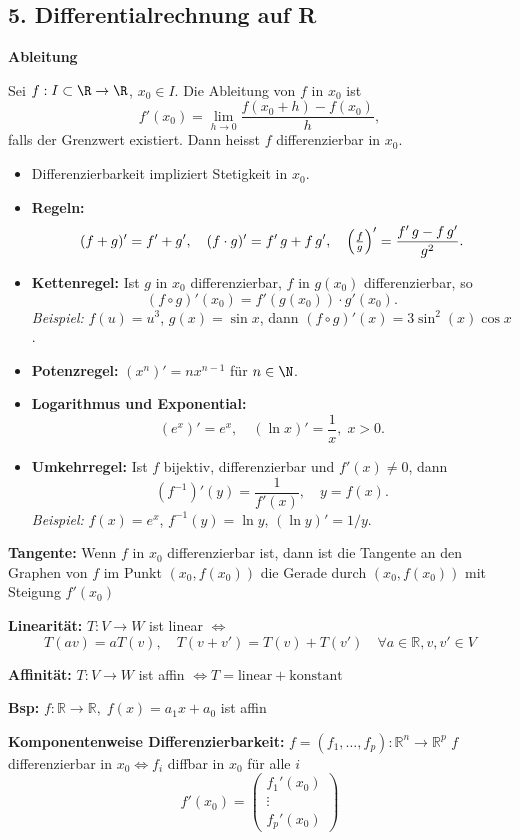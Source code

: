 \subsection{5. Differentialrechnung auf R}
\textbf{Ableitung}
\begin{definition}
  Sei $f:I\subset\R\to\R$, $x_0\in I$. Die Ableitung von $f$ in $x_0$ ist
  \[
    f'(x_0) = \lim_{h\to0} \frac{f(x_0 + h) - f(x_0)}{h},
  \]
  falls der Grenzwert existiert. Dann heisst $f$ differenzierbar in $x_0$.
\end{definition}
\begin{itemize}
  \item Differenzierbarkeit impliziert Stetigkeit in $x_0$.
  \item \textbf{Regeln:}
    \[
      (f+g)' = f' + g', \quad 
      (f\cdot g)' = f'\,g + f\,g', \quad
      \Bigl(\tfrac{f}{g}\Bigr)' = \frac{f'\,g - f\,g'}{g^2}.
    \]
  \item \textbf{Kettenregel:} Ist $g$ in $x_0$ differenzierbar, $f$ in $g(x_0)$ differenzierbar, so
    \[
      (f\circ g)'(x_0) = f'(g(x_0)) \cdot g'(x_0).
    \]
    \emph{Beispiel:} $f(u)=u^3$, $g(x)=\sin x$, dann $(f\circ g)'(x)=3\sin^2(x)\cos x$.
  \item \textbf{Potenzregel:} $(x^n)' = n x^{n-1}$ für $n\in\N$.
  \item \textbf{Logarithmus und Exponential:}  
    \[
      (e^x)' = e^x,\quad (\ln x)' = \frac{1}{x},\; x>0.
    \]
  \item \textbf{Umkehrregel:} Ist $f$ bijektiv, differenzierbar und $f'(x)\ne0$, dann
    \[
      (f^{-1})'(y) = \frac{1}{f'(x)},\quad y = f(x).
    \]
    \emph{Beispiel:} $f(x)=e^x$, $f^{-1}(y)=\ln y$, $(\ln y)' = 1/y$.
\end{itemize}

\textbf{Tangente:}  
Wenn \(f\) in \(x_0\) differenzierbar ist, dann ist die Tangente an den Graphen von \(f\) im Punkt \((x_0, f(x_0))\)  
die Gerade durch \((x_0, f(x_0))\) mit Steigung \(f'(x_0)\)

\textbf{Linearität:}  
\(T: V \to W\) ist linear \(\Leftrightarrow\)  
\[
T(av) = aT(v), \quad T(v + v') = T(v) + T(v')\quad \forall a \in \mathbb{R}, v, v' \in V
\]

\textbf{Affinität:}  
\(T: V \to W\) ist affin \(\Leftrightarrow T = \text{linear} + \text{konstant}\)

\textbf{Bsp:} \(f: \mathbb{R} \to \mathbb{R},\; f(x) = a_1 x + a_0\) ist affin

\textbf{Komponentenweise Differenzierbarkeit:}  
\(f = (f_1, \dots, f_p): \mathbb{R}^n \to \mathbb{R}^p\)  
\(f\) differenzierbar in \(x_0 \Leftrightarrow f_i\) diffbar in \(x_0\) für alle \(i\)  
\[
f'(x_0) = \begin{pmatrix} f_1'(x_0) \\ \vdots \\ f_p'(x_0) \end{pmatrix}
\]

